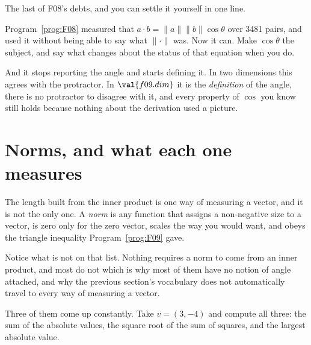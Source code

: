 
\begin{fr}
The last of F08's debts, and you can settle it yourself in one line.

Program~\ref{prog:F08} measured that $a \cdot b = \lVert a \rVert \lVert b
\rVert \cos\theta$ over 3481 pairs, and used it without being able to say what
$\lVert \cdot \rVert$ was. Now it can. Make $\cos\theta$ the subject, and say
what changes about the status of that equation when you do.
\nextframe
\end{fr}

\begin{fr}
And it stops reporting the angle and starts defining it. In two dimensions this
agrees with the protractor. In
$\val{f09.dim}$ it is the \emph{definition} of the angle, there is no
protractor to disagree with it, and every property of $\cos$ you know still
holds because nothing about the derivation used a picture.
\end{fr}

\section{Norms, and what each one measures}
\label{sec:P05-norms}

\begin{fr}
The length built from the inner product is one way of measuring a vector, and
it is not the only one. A \emph{norm} is any function that assigns a
non-negative size to a vector, is zero only for the zero vector, scales the way
you would want, and obeys the triangle inequality Program~\ref{prog:F09} gave.

Notice what is not on that list. Nothing requires a norm to come from an inner
product, and most do not \dash{} which is why most of them have no notion of
angle attached, and why the previous section's vocabulary does not automatically
travel to every way of measuring a vector.

Three of them come up constantly. Take $v = (3, -4)$ and compute all three:
the sum of the absolute values, the square root of the sum of squares, and the
largest absolute value.
\dotline
\nextframe
\end{fr}

